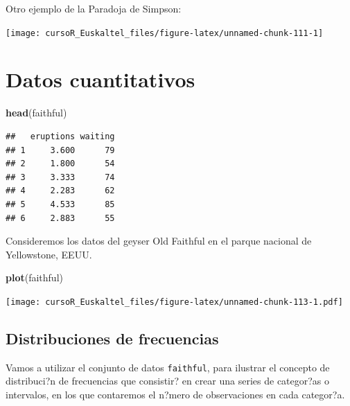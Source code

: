 \documentclass[]{book}
\newenvironment{Shaded}{\begin{snugshade}}{\end{snugshade}}
\newcommand{\KeywordTok}[1]{\textcolor[rgb]{0.13,0.29,0.53}{\textbf{#1}}}
\newcommand{\StringTok}[1]{\textcolor[rgb]{0.31,0.60,0.02}{#1}}
\newcommand{\OperatorTok}[1]{\textcolor[rgb]{0.81,0.36,0.00}{\textbf{#1}}}
\newcommand{\NormalTok}[1]{#1}
\begin{document}
Otro ejemplo de la Paradoja de Simpson:

\begin{center}\texttt{[image: cursoR\_Euskaltel\_files/figure-latex/unnamed-chunk-111-1]} \end{center}

\section{Datos cuantitativos}\label{datos-cuantitativos}

\begin{Shaded}
\begin{Highlighting}[]
\KeywordTok{head}\NormalTok{(faithful)}
\end{Highlighting}
\end{Shaded}

\begin{verbatim}
##   eruptions waiting
## 1     3.600      79
## 2     1.800      54
## 3     3.333      74
## 4     2.283      62
## 5     4.533      85
## 6     2.883      55
\end{verbatim}

Consideremos los datos del geyser Old Faithful en el parque nacional de
Yellowstone, EEUU.

\begin{Shaded}
\begin{Highlighting}[]
\KeywordTok{plot}\NormalTok{(faithful)}
\end{Highlighting}
\end{Shaded}

\texttt{[image: cursoR\_Euskaltel\_files/figure-latex/unnamed-chunk-113-1.pdf]}

\subsection{Distribuciones de
frecuencias}\label{distribuciones-de-frecuencias}

Vamos a utilizar el conjunto de datos \texttt{faithful}, para ilustrar
el concepto de distribuci?n de frecuencias que consistir? en crear una
series de categor?as o intervalos, en los que contaremos el n?mero de
observaciones en cada categor?a.

\begin{Shaded}
\end{Shaded}
\end{document}
